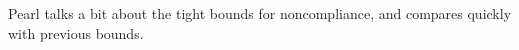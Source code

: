 Pearl talks a bit about the tight bounds for noncompliance, and compares quickly with previous bounds.
